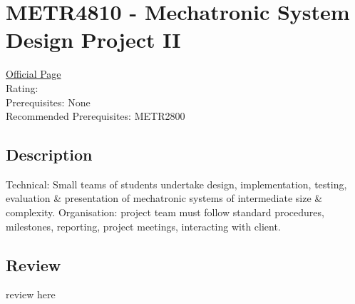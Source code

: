 \hypertarget{METR4810}{\section{METR4810 - Mechatronic System Design Project II}}

\large
\textcolor{turbo_purple}{\href{https://my.uq.edu.au/programs-courses/course.html?course_code=METR4810}{Official Page}} \\
Rating: \cstar\cstar\cstar\cstar\ostar \\
Prerequisites: None \\
Recommended Prerequisites: METR2800

\normalsize
\subsection*{Description}
Technical: Small teams of students undertake design, implementation, testing, evaluation \& presentation of mechatronic systems of intermediate size \& complexity.
Organisation: project team must follow standard procedures, milestones, reporting, project meetings, interacting with client.

\subsection*{Review}
review here
